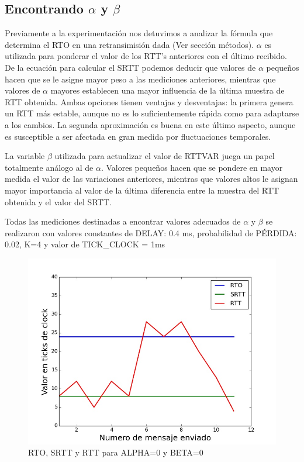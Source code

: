 \subsection{Encontrando $\alpha$ y $\beta$}

Previamente a la experimentación nos detuvimos a analizar la fórmula que determina el RTO en una
retransimisión dada (Ver sección métodos).
$\alpha$ es utilizada para ponderar el valor de los RTT's anteriores con el último recibido.
De la ecuación para calcular el SRTT podemos deducir que valores de $\alpha$ peque\~nos hacen que
se le asigne mayor peso a las mediciones anteriores, mientras que valores de $\alpha$ mayores
establecen una mayor influencia de la última muestra de RTT obtenida.
Ambas opciones tienen ventajas y desventajas: la primera genera un RTT más estable, aunque no es
lo suficientemente rápida como para adaptarse a los cambios. La segunda aproximación es buena en
este último aspecto, aunque es susceptible a ser afectada en gran medida por fluctuaciones
temporales.

La variable $\beta$ utilizada para actualizar el valor de RTTVAR
juega un papel totalmente análogo al de $\alpha$. Valores peque\~nos hacen que se pondere en
mayor medida el valor de las variaciones anteriores, mientras que valores altos le asignan
mayor importancia al valor de la última diferencia entre la muestra del RTT obtenida y el valor
del SRTT.

Todas las mediciones destinadas a encontrar valores adecuados de $\alpha$ y $\beta$ se realizaron
con valores constantes de DELAY: 0.4 ms, probabilidad de PÉRDIDA: 0.02, K=4 y valor de
TICK\_CLOCK = 1ms

\begin{figure}[H]
  \begin{center}
      \includegraphics[scale=0.32]{imagenes/ALPHA_0_BETA_0.jpg}
      \caption{RTO, SRTT y RTT para ALPHA=0 y BETA=0}
  \end{center}
\end{figure}

